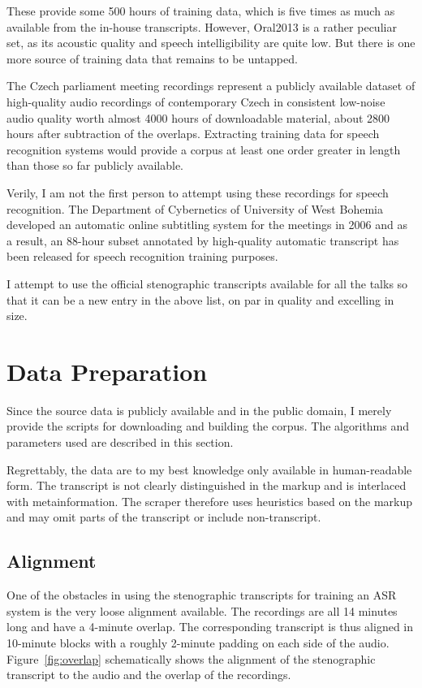 \documentclass[12pt,a4paper]{report}
\begin{document}
These provide some 500 hours of training data, which is five times as much as
available from the in-house transcripts. However, Oral2013 is a rather peculiar
set, as its acoustic quality and speech intelligibility are quite low. But there
is one more source of training data that remains to be untapped.

The Czech parliament meeting recordings represent a publicly available dataset
of high-quality audio recordings of contemporary Czech in consistent low-noise
audio quality worth almost 4000 hours of downloadable material, about 2800 hours
after subtraction of the overlaps. Extracting
training data for speech recognition systems would provide a corpus at least
one order greater in length than those so far publicly available.

Verily, I am not the first person to attempt using these recordings for speech
recognition. The Department of Cybernetics of University of West Bohemia
developed an automatic online subtitling system for the meetings in
2006\cite{pspsubs} and as a result, an 88-hour subset annotated by high-quality
automatic transcript has been released for speech recognition training
purposes\cite{pspdata}.

I attempt to use the official stenographic transcripts available for all the
talks so that it can be a new entry in the above list, on par in quality and
excelling in size.

\section{Data Preparation}

Since the source data is publicly available and in the public domain, I merely
provide the scripts for downloading and building the corpus. The algorithms and
parameters used are described in this section.

Regrettably, the data are to my best knowledge only available in human-readable
form. The transcript is not clearly distinguished in the markup and is
interlaced with metainformation. The scraper therefore uses heuristics based on
the markup and may omit parts of the transcript or include non-transcript.

\subsection{Alignment}

One of the obstacles in using the stenographic transcripts for training an ASR
system is the very loose alignment available. The recordings are all 14 minutes
long and have a 4-minute overlap. The corresponding transcript is thus aligned
in 10-minute blocks with a roughly 2-minute padding on each side of the audio.
Figure~\ref{fig:overlap} schematically shows the alignment of the stenographic
transcript to the audio and the overlap of the recordings.
\end{document}

